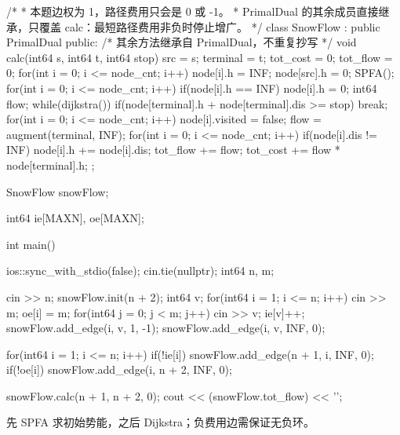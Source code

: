 \begin{codeline}
/*
 * 本题边权为 1，路径费用只会是 0 或 -1。
 * PrimalDual 的其余成员直接继承，只覆盖 calc：最短路径费用非负时停止增广。
 */
class SnowFlow : public PrimalDual {
public:
    /* 其余方法继承自 PrimalDual，不重复抄写 */
    void calc(int64 s, int64 t, int64 stop) {
        src = s;
        terminal = t;
        tot_cost = 0;
        tot_flow = 0;
        for(int i = 0; i <= node_cnt; i++) {
            node[i].h = INF;
        }
        node[src].h = 0;
        SPFA();
        for(int i = 0; i <= node_cnt; i++) {
            if(node[i].h == INF) {
                node[i].h = 0;
            }
        }
        int64 flow;
        while(dijkstra()) {
            if(node[terminal].h + node[terminal].dis >= stop) {
                break;
            }
            for(int i = 0; i <= node_cnt; i++) {
                node[i].visited = false;
            }
            flow = augment(terminal, INF);
            for(int i = 0; i <= node_cnt; i++) {
                if(node[i].dis != INF) {
                    node[i].h += node[i].dis;
                }
            }
            tot_flow += flow;
            tot_cost += flow * node[terminal].h;
        }
    }
};

SnowFlow snowFlow;

int64 ie[MAXN], oe[MAXN];

\end{codeline}
\vspace{-0.9\baselineskip}
\begin{codeline}[firstnumber=47]
int main() {
    ios::sync_with_stdio(false);
    cin.tie(nullptr);
    int64 n, m;

    cin >> n;
    snowFlow.init(n + 2);
    int64 v;
    for(int64 i = 1; i <= n; i++) {
        cin >> m;
        oe[i] = m;
        for(int64 j = 0; j < m; j++) {
            cin >> v;
            ie[v]++;
            snowFlow.add_edge(i, v, 1, -1);
            snowFlow.add_edge(i, v, INF, 0);
        }
    }

    for(int64 i = 1; i <= n; i++) {
        if(!ie[i]) {
            snowFlow.add_edge(n + 1, i, INF, 0);
        }
        if(!oe[i]) {
            snowFlow.add_edge(i, n + 2, INF, 0);
        }
    }

    snowFlow.calc(n + 1, n + 2, 0);
    cout << (snowFlow.tot_flow) << '\n';
}
\end{codeline}
\begin{warnbox}
先 SPFA 求初始势能，之后 Dijkstra；负费用边需保证无负环。
\end{warnbox}

